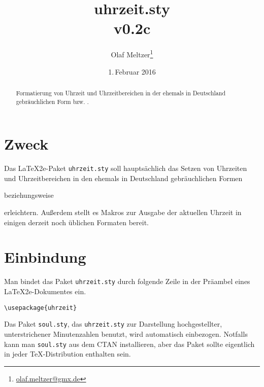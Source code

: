 \documentclass{scrartcl}
\begin{document}
\title{uhrzeit.sty\\\protect\Large v0.2c}
\author{Olaf Meltzer\thanks{\protect\url{olaf.meltzer@gmx.de}}}
\date{1.\,Februar 2016}

\maketitle

\begin{abstract}
Formatierung von Uhrzeit und Uhrzeitbereichen in der ehemals in
Deutschland gebräuchlichen Form  bzw. .
\end{abstract}

\tableofcontents

\newpage

\section{Zweck}
Das \LaTeX2e-Paket \verb|uhrzeit.sty| soll hauptsächlich das
Setzen von Uhrzeiten und Uhrzeitbereichen in den ehemals in
Deutschland gebräuchlichen Formen

\begin{center}\end{center}

beziehungsweise

\begin{center}\end{center}

erleichtern. Außerdem stellt es Makros zur Ausgabe der
aktuellen Uhrzeit in einigen derzeit noch üblichen Formaten bereit.

\section{Einbindung}

Man bindet das Paket \verb|uhrzeit.sty| durch folgende Zeile in der
Präambel eines \LaTeX2e-Dokumentes ein.

\begin{center}
\verb|\usepackage{uhrzeit}|
\end{center}

Das Paket \verb|soul.sty|, das \verb|uhrzeit.sty| zur Darstellung
hochgestellter, unterstrichener Minutenzahlen benutzt, wird
automatisch einbezogen. Notfalls kann man \verb|soul.sty| aus dem
CTAN installieren, aber das Paket sollte eigentlich in jeder
\TeX-Distribution enthalten sein.
\end{document}
